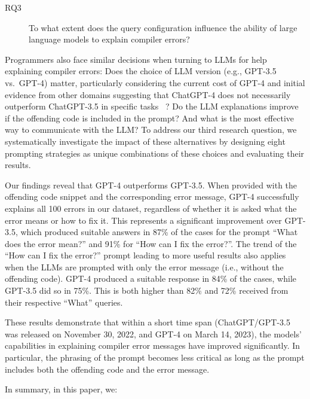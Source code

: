\documentclass[preprint,12pt]{elsarticle}
\begin{document}
\begin{description}
\item[RQ3] To what extent does the query configuration influence the ability of large language models to explain compiler errors?
\end{description}

Programmers also face similar decisions when turning to LLMs for help explaining compiler errors: Does the choice of LLM version (e.g., GPT-3.5 vs.~GPT-4) matter, particularly considering the current cost of GPT-4 and initial evidence from other domains suggesting that ChatGPT-4 does not necessarily outperform ChatGPT-3.5 in specific tasks ~\cite{gene}? Do the LLM explanations improve if the offending code is included in the prompt? And what is the most effective way to communicate with the LLM? To address our third research question, we systematically investigate the impact of these alternatives by designing eight prompting strategies as unique combinations of these choices and evaluating their results.

Our findings reveal that GPT-4 outperforms GPT-3.5. When provided with the offending code snippet and the corresponding error message, GPT-4 successfully explains all 100 errors in our dataset, regardless of whether it is asked what the error means or how to fix it. This represents a significant improvement over GPT-3.5, which produced suitable answers in 87\% of the cases for the prompt ``What does the error mean?'' and 91\% for ``How can I fix the error?''. The trend of the ``How can I fix the error?'' prompt leading to more useful results also applies when the LLMs are prompted with only the error message (i.e., without the offending code). GPT-4 produced a suitable response in 84\% of the cases, while GPT-3.5 did so in 75\%. This is both higher than 82\% and 72\% received from their respective ``What'' queries.

These results demonstrate that within a short time span (ChatGPT/GPT-3.5 was released on November 30, 2022, and GPT-4 on March 14, 2023), the models' capabilities in explaining compiler error messages have improved significantly. In particular, the phrasing of the prompt becomes less critical as long as the prompt includes both the offending code and the error message.

In summary, in this paper, we:
\end{document}
